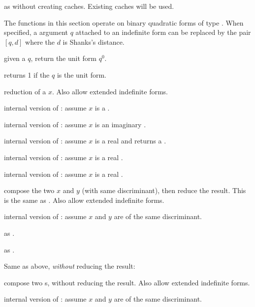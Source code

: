  as  without
creating caches. Existing caches will be used.


The functions in this section operate on binary quadratic forms of type
. When specified, a  argument $q$ attached to an
indefinite form can be replaced by the pair $[q, d]$ where the 
$d$ is Shanks's distance.

 given a  $q$, return the unit form $q^0$.

 returns 1 if the 
$q$ is the unit form.


 reduction of a  $x$. Also allow extended
indefinite forms.

 internal version of : assume $x$
is a .

 internal version of : assume $x$
is an imaginary .

 internal version of : assume $x$
is a real  and returns a .

 internal version of : assume $x$
is a real .

 internal version of :
assume $x$ is a real .


 compose the two  $x$ and $y$ (with
same discriminant), then reduce the result. This is the same as
. Also allow extended indefinite forms.

 internal version of : assume
$x$ and $y$ are  of the same discriminant.

 as .

 as .

\noindent Same as above, \emph{without} reducing the result:

 compose two s,
without reducing the result. Also allow extended indefinite forms.

 internal version of :
assume $x$ and $y$ are  of the same discriminant.

